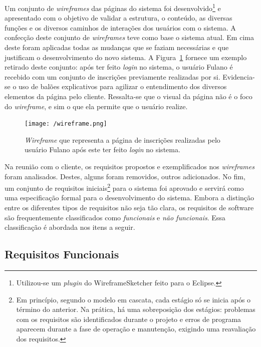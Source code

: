 \documentclass[
  10.5pt,				  %
	openright,			%
	twoside,			  %
  a5paper,
  chapter=TITLE,	%
	section=TITLE,	%
  hyphens,        %
	english,        %
	brazil          %
]{abntex2}
\begin{document}
Um conjunto de \emph{wireframes} das páginas do sistema foi desenvolvido\footnote{Utilizou-se um \emph{plugin} do WireframeSketcher feito para o Eclipse.} e apresentado com o objetivo de validar a estrutura, o conteúdo, as diversas funções e os diversos caminhos de interações dos usuários com o sistema. A confecção deste conjunto de \emph{wireframes} teve como base o sistema atual. Em cima deste foram aplicadas todas as mudanças que se faziam necessárias e que justificam o desenvolvimento do novo sistema. A Figura~\ref{fig:wireframe} fornece um exemplo retirado deste conjunto: após ter feito \emph{login} no sistema, o usuário Fulano é recebido com um conjunto de inscrições previamente realizadas por si. Evidencia-se o uso de balões explicativos para agilizar o entendimento dos diversos elementos da página pelo cliente. Ressalta-se que o visual da página não é o foco do \emph{wireframe}, e sim o que ela permite que o usuário realize.

\begin{figure}[!ht]
  \caption{\label{fig:wireframe} \emph{Wireframe} que representa a página de inscrições realizadas pelo usuário Fulano após este ter feito \emph{login} no sistema. }
  \begin{center}
    \texttt{[image: /wireframe.png]}
  \end{center}
\end{figure}

Na reunião com o cliente, os requisitos propostos e exemplificados nos \emph{wireframes} foram analisados. Destes, alguns foram removidos, outros adicionados. No fim, um conjunto de requisitos iniciais\footnote{Em princípio, segundo o modelo em cascata, cada estágio só se inicia após o término do anterior. Na prática, há uma sobreposição dos estágios: problemas com os requisitos são identificados durante o projeto e erros de programa aparecem durante a fase de operação e manutenção, exigindo uma reavaliação dos requisitos.} para o sistema foi aprovado e servirá como uma especificação formal para o desenvolvimento do sistema. Embora a distinção entre os diferentes tipos de requisitos não seja tão clara, os requisitos de software são frequentemente classificados como \emph{funcionais} e \emph{não funcionais}. Essa classificação é abordada nos itens a seguir.

\subsection{Requisitos Funcionais}\label{sec:requisitos_funcionais}
\end{document}
